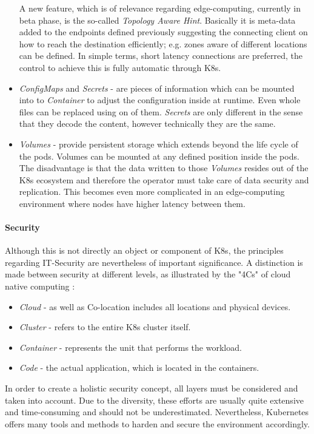 \documentclass[MSC,Master,english]{twbook}%
\begin{document}
\begin{itemize}
    A new feature, which is of relevance regarding edge-computing, currently in beta phase, is the so-called \textit{Topology Aware Hint}. Basically it is meta-data added to the endpoints defined previously suggesting the connecting client on how to reach the destination efficiently; e.g. zones aware of different locations can be defined. In simple terms, short latency connections are preferred, the control to achieve this is fully automatic through \ac{K8s}.
    \item \textit{ConfigMaps} and \textit{Secrets} - are pieces of information which can be mounted into to \textit{Container} to adjust the configuration inside at runtime. Even whole files can be replaced using on of them. \textit{Secrets} are only different in the sense that they decode the content, however technically they are the same.
    \item \textit{Volumes} - provide persistent storage which extends beyond the life cycle of the pods. Volumes can be mounted at any defined position inside the pods. The disadvantage is that the data written to those \textit{Volumes} resides out of the \ac{K8s} ecosystem and therefore the operator must take care of data security and replication. This becomes even more complicated in an edge-computing environment where nodes have higher latency between them.
\end{itemize}

\paragraph{Security} Although this is not directly an object or component of \ac{K8s}, the principles regarding IT-Security are nevertheless of important significance. A distinction is made between security at different levels, as illustrated by the "4Cs" of cloud native computing \cite{k8s-4cs}:

\begin{itemize}
    \item \textit{Cloud} - as well as Co-location includes all locations and physical devices.
    \item \textit{Cluster} - refers to the entire \ac{K8s} cluster itself.
    \item \textit{Container} - represents the unit that performs the workload.
    \item \textit{Code} - the actual application, which is located in the containers.
\end{itemize}

In order to create a holistic security concept, all layers must be considered and taken into account. Due to the diversity, these efforts are usually quite extensive and time-consuming and should not be underestimated. Nevertheless, Kubernetes offers many tools and methods to harden and secure the environment accordingly.
\end{document}
